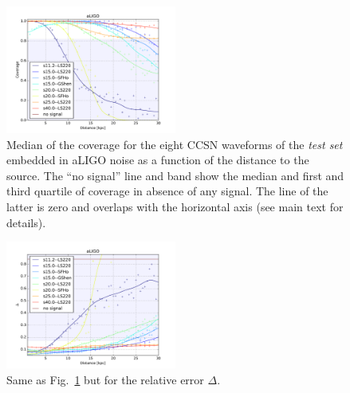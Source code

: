 \begin{figure}[t]
  \centering
  \includegraphics[width=0.5\textwidth]{plots/aLIGO_coverage_allwvfs}
 \caption{Median of the coverage for the eight CCSN waveforms of the {\it test set} embedded in aLIGO noise as a function of the  distance to the source. The ``no signal'' line and band show the median and first and third quartile of coverage in absence of any signal. The line of the latter is zero and overlaps with the horizontal axis (see main text for details). } \label{fig:aLIGO_cov_allwvf}
\end{figure}

\begin{figure}[t]
  \centering
  \includegraphics[width=0.5\textwidth]{plots/aLIGO_delta_allwvfs}
 \caption{Same as Fig.~\ref{fig:aLIGO_cov_allwvf} but for the relative error $\Delta$. }
\label{fig:aLIGO_prec_allwvf}
\end{figure}

